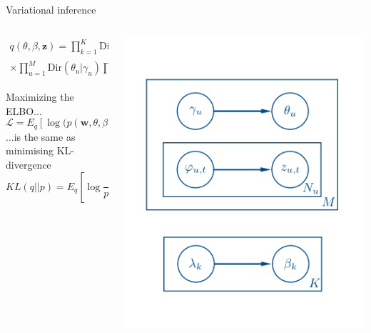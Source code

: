 \documentclass[aspectratio=1610]{beamer}
\begin{document}
\begin{frame}{Variational inference}

\begin{columns}[C]
    \begin{column}{.5\textwidth}
    \begin{multline*} 
    q(\theta, \beta, \mathbf{z}) = \prod_{k=1}^K \text{Dir}(\beta_k | \lambda_k) \times \\  \times \prod_{u=1}^M\text{Dir}(\theta_u | \gamma_u) \prod_{t=1}^N \text{Mult}(z_{u,t} | \varphi_{u,t})
    \end{multline*}
    
    \vspace{2em}
    Maximizing the ELBO...
    \[
    \mathcal{L} = E_q \left[\log(p(\mathbf{w}, \theta, \beta, \mathbf{z})\right] - E_q \left[\log q(\theta, \beta, \mathbf{z}) \right]
    \]    
    ...is the same as minimising KL-divergence
    \[
    KL(q || p) = E_q \left[ \log\frac{q(\theta, \beta, \mathbf{z})}{p(\theta, \beta, \mathbf{z} | \mathbf{w})}\right]
    \]
    \end{column}
    \begin{column}{.5\textwidth} 
    \vspace{0em}
    \includegraphics[scale=0.25]{images/vi.png}   
    \end{column}
\end{columns}

\end{frame}
\end{document}
